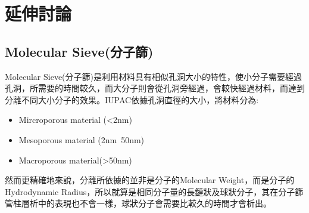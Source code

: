 \section{延伸討論}

\subsection*{Molecular Sieve(分子篩)}
Molecular Sieve(分子篩)是利用材料具有相似孔洞大小的特性，使小分子需要經過孔洞，所需要的時間較久，而大分子則會從孔洞旁經過，會較快經過材料，而達到分離不同大小分子的效果。IUPAC依據孔洞直徑的大小，將材料分為:\cite{Molecula6:online}%

\begin{itemize}
  \item Mircroporous material (<2nm)
  \item Mesoporous material (2nm~50nm)
  \item Macroporous material(>50nm)
\end{itemize}

然而更精確地來說，分離所依據的並非是分子的Molecular Weight，而是分子的Hydrodynamic Radius，所以就算是相同分子量的長鏈狀及球狀分子，其在分子篩管柱層析中的表現也不會一樣，球狀分子會需要比較久的時間才會析出。\cite{YMCSECMA7:online}






 

